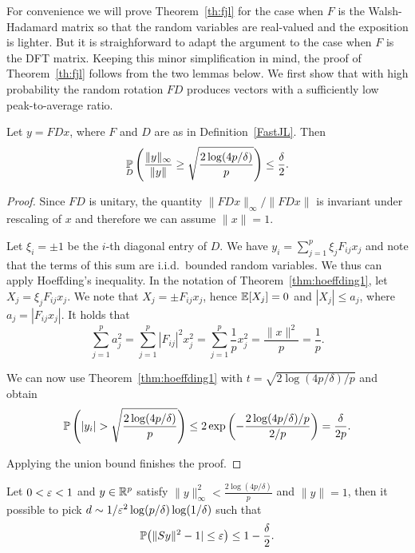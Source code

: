 For convenience we will prove Theorem~\ref{th:fjl} for the case when $F$ is the Walsh-Hadamard matrix so that the random variables are real-valued and the exposition is lighter. But it is straighforward to adapt the argument to the case when $F$ is the DFT matrix. Keeping this minor simplification in mind, the proof of Theorem~\ref{th:fjl} follows from the two lemmas below.
We first show that with high probability the random rotation $FD$ produces vectors with a sufficiently low peak-to-average ratio.

\begin{lemma}\label{le:par2}
Let $y = FDx$, where $F$ and $D$ are as in Definition~\ref{FastJL}. Then
\begin{equation}\label{jlpar}
\underset{D}{\P} \left( \frac{\| y \|_\infty}{\|y\|} \ge  \sqrt{\frac{2 \log (4p/\delta)}{p}}\right) \le \frac{\delta}{2}.
\end{equation}
\end{lemma}

\begin{proof}
Since $FD$ is unitary, the quantity $\|FDx\|_\infty/\|FDx\|$ is invariant under rescaling of $x$ and therefore we can assume $\|x\|=1$.

Let $\xi_i = \pm 1$ be the $i$-th diagonal entry of $D$. We have $y_i  =  \sum_{j=1}^p \xi_j F_{ij} x_j$ and note that the terms of this sum are i.i.d.\ bounded random variables. We thus can apply Hoeffding's inequality. In the notation of Theorem~\ref{thm:hoeffding1},
let $X_j =  \xi_j F_{ij} x_j$. We note that $X_j = \pm  F_{ij} x_j$,  hence $\E[X_j] =0$ and 
$|X_j  | \le a_j$, where $a_j = \left|F_{ij} x_j\right|$. It holds that
$$\sum_{j=1}^p a_j^2 = \sum_{j=1}^p |F_{ij}|^2 x_j^2  = \sum_{j=1}^p \frac{1}{p} x_j^2 = \frac{\|x\|^2}{p} = \frac{1}{p}.$$

We can now use Theorem~\ref{thm:hoeffding1} with $t = \sqrt{2 \log(4p/\delta)/p}$ and obtain
$$\P \left( |y_i| >  \sqrt{ \frac{2\log(4p/\delta)}{p}} \right) \le 2\exp\left(-\displaystyle{\frac{2 \log(4p/\delta)/p}{2/p}}\right) =   \frac{\delta}{2p}.$$



Applying the union bound finishes the proof. 
\end{proof}

\begin{lemma} \label{le:par3}
Let $0<\eps<1$ and $y\in \RR^p$ satisfy  $\|y \|_\infty^2 <  \frac{2\log (4p/\delta)}{p}$ and $\|y\|=1$, then it possible to pick $d \sim 1/\eps^2 \log(p/\delta) \log(1/\delta)$ such that
$$\P\big( \|Sy\|^2 - 1 | \le \eps \big) \le  1- \frac{\delta}{2}.$$
\end{lemma}

